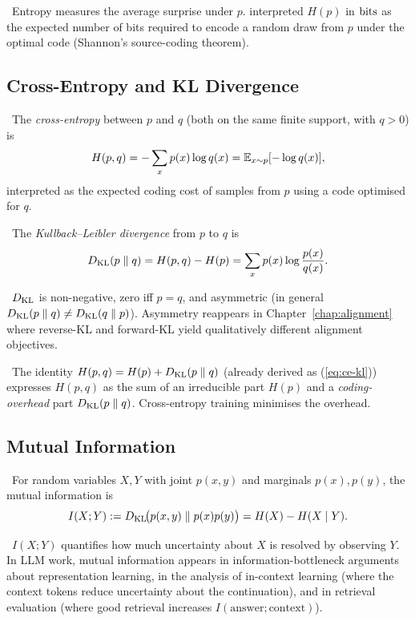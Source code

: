 \Cons\ Entropy measures the average surprise under $p$.
\citet{shannon1948} interpreted $H(p)$ in $\mathrm{bits}$ as the expected
number of bits required to encode a random draw from $p$ under the
optimal code (Shannon's source-coding theorem).

\subsection{Cross-Entropy and KL Divergence}

\Def\ The \emph{cross-entropy} between $p$ and $q$ (both on the same
finite support, with $q > 0$) is
\begin{equation}
H(p, q) = -\sum_{x} p(x) \log q(x) = \mathbb{E}_{x \sim p}[-\log q(x)],
\end{equation}
interpreted as the expected coding cost of samples from $p$ using a
code optimised for $q$.

\Def\ The \emph{Kullback--Leibler divergence} from $p$ to $q$ is
\begin{equation}
D_{\mathrm{KL}}(p \parallel q) = H(p, q) - H(p) = \sum_x p(x) \log \frac{p(x)}{q(x)}.
\label{eq:kl-def}
\end{equation}

\Ident\ $D_{\mathrm{KL}}$ is non-negative, zero iff $p = q$, and asymmetric (in
general $D_{\mathrm{KL}}(p\parallel q) \neq D_{\mathrm{KL}}(q\parallel p)$). Asymmetry reappears
in Chapter~\ref{chap:alignment} where reverse-KL and forward-KL yield qualitatively different
alignment objectives.

\Cons\ The identity $H(p,q) = H(p) + D_{\mathrm{KL}}(p\parallel q)$ (already
derived as (\ref{eq:ce-kl})) expresses $H(p,q)$ as the sum of an
irreducible part $H(p)$ and a \emph{coding-overhead} part
$D_{\mathrm{KL}}(p\parallel q)$. Cross-entropy training minimises the overhead.

\subsection{Mutual Information}

\Def\ For random variables $X, Y$ with joint $p(x, y)$ and marginals
$p(x), p(y)$, the mutual information is
\begin{equation}
I(X; Y) := D_{\mathrm{KL}}\!\big(p(x, y) \parallel p(x)p(y)\big) = H(X) - H(X \mid Y).
\end{equation}

\Cons\ $I(X; Y)$ quantifies how much uncertainty about $X$ is resolved
by observing $Y$. In LLM work, mutual information appears in
information-bottleneck arguments about representation learning, in
the analysis of in-context learning (where the context tokens reduce
uncertainty about the continuation), and in retrieval evaluation
(where good retrieval increases $I(\text{answer}; \text{context})$).

